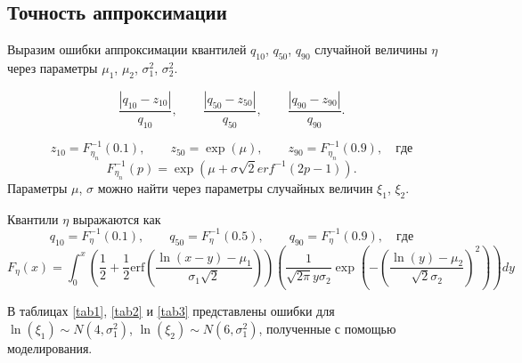 \documentclass[12pt]{article}
\begin{document}
\subsection{Точность аппроксимации}

Выразим ошибки аппроксимации квантилей $q_{10}$, $q_{50}$, $q_{90}$ случайной величины $\eta$ через параметры $\mu_{1}$, $\mu_{2}$, $\sigma_{1}^{2}$, $\sigma_{2}^{2}$.

\[\dfrac{\left| q_{10} - z_{10}\right|}{q_{10}}, \quad\quad \dfrac{\left| q_{50} - z_{50}\right|}{q_{50}}, \quad\quad \dfrac{\left| q_{90} - z_{90}\right|}{q_{90}}.\]

\[z_{10} = F_{\eta_{n}}^{-1}(0.1), \quad\quad z_{50} = \exp(\mu), \quad\quad z_{90} = F_{\eta_{n}}^{-1}(0.9), \quad где\]
\[F_{\eta_{n}}^{-1}(p) = \exp(\mu+\sigma\sqrt{2}erf^{-1}(2p-1)).\]
Параметры $\mu$, $\sigma$ можно найти через параметры случайных величин $\xi_{1}$, $\xi_{2}$.

Квантили $\eta$ выражаются как
\[q_{10} = F_{\eta}^{-1}(0.1), \quad\quad q_{50} = F_{\eta}^{-1}(0.5), \quad\quad q_{90} = F_{\eta}^{-1}(0.9), \quad где\]
\[F_{\eta}(x) = \int_{0}^{x}\left( \dfrac{1}{2}+\dfrac{1}{2} \mathrm{erf}\left( \dfrac{\ln(x-y)-\mu_{1}}{\sigma_{1}\sqrt{2}}\right) \right) \left( \dfrac{1}{\sqrt{2\pi}y\sigma_{2}}\exp\left( -\left( \dfrac{\ln(y)-\mu_{2}}{\sqrt{2}\sigma_{2}}\right) ^{2}\right) \right) dy \]

В таблицах \ref{tab1}, \ref{tab2} и \ref{tab3} представлены ошибки для $\ln(\xi_{1}) \sim N(4, \sigma _{1}^{2})$, $\ln(\xi_{2}) \sim N(6, \sigma _{1}^{2})$, полученные с помощью моделирования.

\end{document}
